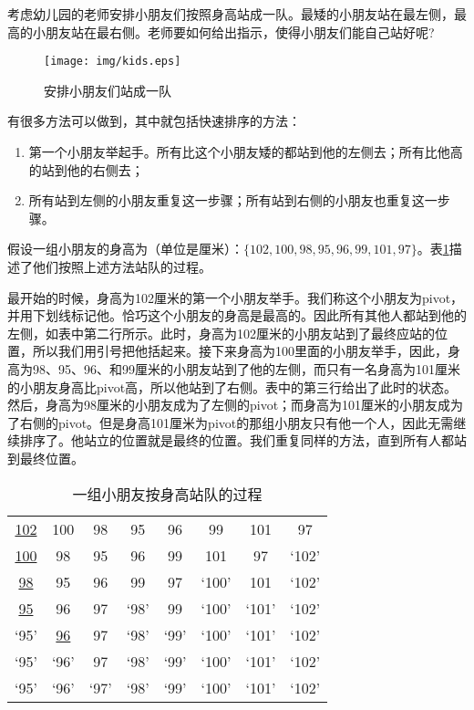 \documentclass[UTF8]{article}
\begin{document}
考虑幼儿园的老师安排小朋友们按照身高站成一队。最矮的小朋友站在最左侧，最高的小朋友站在最右侧。老师要如何给出指示，使得小朋友们能自己站好呢?

\begin{figure}[htbp]
 \centering
 \texttt{[image: img/kids.eps]}
 \caption{安排小朋友们站成一队}
 \label{fig:knuth-ssort}
\end{figure}

有很多方法可以做到，其中就包括快速排序的方法：

\begin{enumerate}
  \item 第一个小朋友举起手。所有比这个小朋友矮的都站到他的左侧去；所有比他高的站到他的右侧去；
  \item 所有站到左侧的小朋友重复这一步骤；所有站到右侧的小朋友也重复这一步骤。
\end{enumerate}

假设一组小朋友的身高为（单位是厘米）：$\{102, 100, 98, 95, 96, 99, 101, 97\}$。表\ref{tab:kids-sort}描述了他们按照上述方法站队的过程。

最开始的时候，身高为102厘米的第一个小朋友举手。我们称这个小朋友为pivot，并用下划线标记他。恰巧这个小朋友的身高是最高的。因此所有其他人都站到他的左侧，如表中第二行所示。此时，身高为102厘米的小朋友站到了最终应站的位置，所以我们用引号把他括起来。接下来身高为100里面的小朋友举手，因此，身高为98、95、96、和99厘米的小朋友站到了他的左侧，而只有一名身高为101厘米的小朋友身高比pivot高，所以他站到了右侧。表中的第三行给出了此时的状态。然后，身高为98厘米的小朋友成为了左侧的pivot；而身高为101厘米的小朋友成为了右侧的pivot。但是身高101厘米为pivot的那组小朋友只有他一个人，因此无需继续排序了。他站立的位置就是最终的位置。我们重复同样的方法，直到所有人都站到最终位置。

\begin{table}[htbp]
\centering
\begin{tabular}{ | c c c c c c c c |}
\hline
\underline{102} & 100 & 98 & 95 & 96 & 99 & 101 & 97 \\
\underline{100} & 98 & 95 & 96 & 99 & 101 & 97 & `102' \\
\underline{98} & 95 & 96 & 99 & 97 & `100' & 101 & `102' \\
\underline{95} & 96 & 97 & `98' & 99 & `100' & `101' & `102' \\
`95' & \underline{96} & 97 & `98' & `99' & `100' & `101' & `102' \\
`95' & `96' & 97 & `98' & `99' & `100' & `101' & `102' \\
`95' & `96' & `97' & `98' & `99' & `100' & `101' & `102' \\
\hline
\end{tabular}
\caption{一组小朋友按身高站队的过程} \label{tab:kids-sort}
\end{table}
\end{document}
